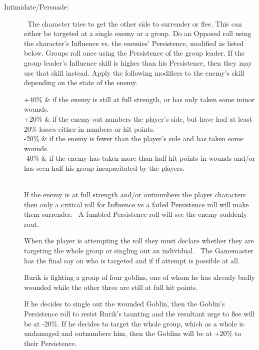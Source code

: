 \begin{description}
\begin{rpg-list}
		\end{rpg-list}
	\item[Intimidate/Persuade:]  The character tries to get the other side to surrender or flee. This can either be targeted at a single enemy or a group.  Do an Opposed roll using the character’s Influence vs. the enemies’ Persistence, modified as listed below. Groups roll once using the Persistence of the group leader. If the group leader’s Influence skill is higher than his Persistence, then they may use that skill instead. Apply the following modifiers to the enemy’s skill depending on the state of the enemy.
	\begin{rpg-table}[|c|X|]
		\hline
		+40\% & if the enemy is still at full strength, or has only taken some minor wounds.\\
		+20\% & if the enemy out numbers the player’s side, but have had at least 20\% losses either in numbers or hit points.\\
		-20\% & if the enemy is fewer than the player’s side and has taken some wounds.\\
		-40\% & if the enemy has taken more than half hit points in wounds and/or has seen half his group incapacitated by the players.\\
		\hline
		\\
		\hline
	\end{rpg-table}

If the enemy is at full strength and/or outnumbers the player characters then only a critical roll for Influence vs a failed Persistence roll will make them surrender.  A fumbled Persistence roll will see the enemy suddenly rout.

When the player is attempting the roll they must declare whether they are targeting the whole group or singling out an individual.  The Gamemaster has the final say on who is targeted and if if attempt is possible at all. 

	\begin{rpg-examplebox}
Rurik is fighting a group of four goblins, one of whom he has already badly wounded while the other three are still at full hit points. 

If he decides to single out the wounded Goblin, then the Goblin’s Persistence roll to resist Rurik’s taunting and the resultant urge to flee will be at -20\%. If he decides to target the whole group, which as a whole is undamaged and outnumbers him, then the Goblins will be at +20\% to their Persistence. 
	\end{rpg-examplebox}


\end{description}

